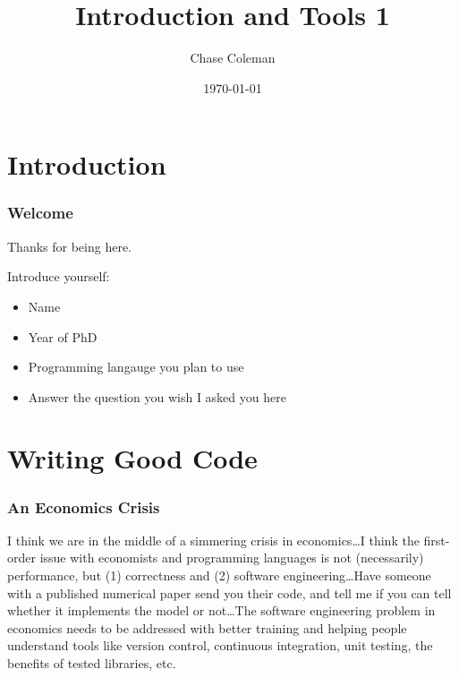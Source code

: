 \documentclass[10pt]{beamer}
\title{Introduction and Tools 1}
\author{Chase Coleman}
\institute{NYU Stern}
\date[]{\today}
\begin{document}
\begin{frame}
  \thispagestyle{empty}
  \titlepage
\end{frame}


\section{Introduction}

\begin{frame} \frametitle{Welcome}

  Thanks for being here.

  Introduce yourself:
  \begin{itemize}
    \item Name
    \item Year of PhD
    \item Programming langauge you plan to use
    \item Answer the question you wish I asked you here
  \end{itemize}
\end{frame}

\section{Writing Good Code}

\begin{frame} \frametitle{An Economics Crisis}

  \begin{displayquote}
    I think we are in the middle of a simmering crisis in economics\dots I think the first-order issue with economists and programming languages is not (necessarily) performance, but (1) correctness and (2) software engineering\dots Have someone with a published numerical paper send you their code, and tell me if you can tell whether it implements the model or not\dots The software engineering problem in economics needs to be addressed with better training and helping people understand tools like version control, continuous integration, unit testing, the benefits of tested libraries, etc.
  \end{displayquote}

\end{frame}
\end{document}
